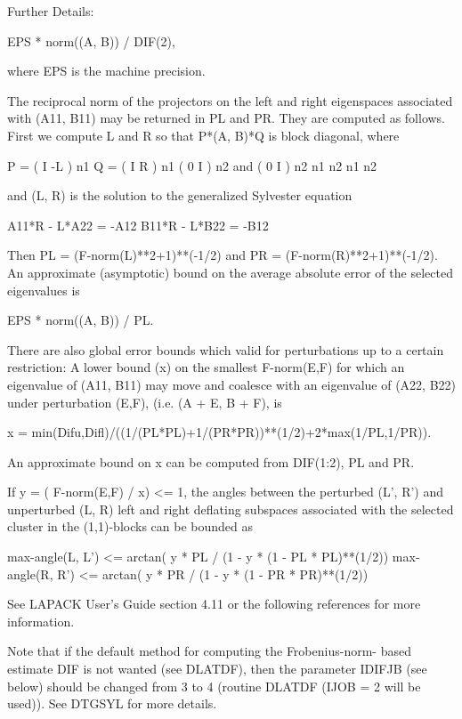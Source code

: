 \begin{DoxyParagraph}{Further Details\+: }
\begin{DoxyVerb}
       EPS * norm((A, B)) / DIF(2),

  where EPS is the machine precision.

  The reciprocal norm of the projectors on the left and right
  eigenspaces associated with (A11, B11) may be returned in PL and PR.
  They are computed as follows. First we compute L and R so that
  P*(A, B)*Q is block diagonal, where

       P = ( I -L ) n1           Q = ( I R ) n1
           ( 0  I ) n2    and        ( 0 I ) n2
             n1 n2                    n1 n2

  and (L, R) is the solution to the generalized Sylvester equation

       A11*R - L*A22 = -A12
       B11*R - L*B22 = -B12

  Then PL = (F-norm(L)**2+1)**(-1/2) and PR = (F-norm(R)**2+1)**(-1/2).
  An approximate (asymptotic) bound on the average absolute error of
  the selected eigenvalues is

       EPS * norm((A, B)) / PL.

  There are also global error bounds which valid for perturbations up
  to a certain restriction:  A lower bound (x) on the smallest
  F-norm(E,F) for which an eigenvalue of (A11, B11) may move and
  coalesce with an eigenvalue of (A22, B22) under perturbation (E,F),
  (i.e. (A + E, B + F), is

   x = min(Difu,Difl)/((1/(PL*PL)+1/(PR*PR))**(1/2)+2*max(1/PL,1/PR)).

  An approximate bound on x can be computed from DIF(1:2), PL and PR.

  If y = ( F-norm(E,F) / x) <= 1, the angles between the perturbed
  (L', R') and unperturbed (L, R) left and right deflating subspaces
  associated with the selected cluster in the (1,1)-blocks can be
  bounded as

   max-angle(L, L') <= arctan( y * PL / (1 - y * (1 - PL * PL)**(1/2))
   max-angle(R, R') <= arctan( y * PR / (1 - y * (1 - PR * PR)**(1/2))

  See LAPACK User's Guide section 4.11 or the following references
  for more information.

  Note that if the default method for computing the Frobenius-norm-
  based estimate DIF is not wanted (see DLATDF), then the parameter
  IDIFJB (see below) should be changed from 3 to 4 (routine DLATDF
  (IJOB = 2 will be used)). See DTGSYL for more details.\end{DoxyVerb}
 
\end{DoxyParagraph}
